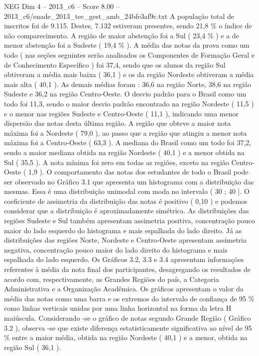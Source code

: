 \begin{textsample}{NEG Dim 4 – 2013\_c6 – Score 8.00 – 2013\_c6/enade\_2013\_tec\_gest\_amb\_24bfe3af9c.txt}
A população total de inscritos foi de 9.115.
Destes, 7.132 estiveram presentes, sendo 21,8 \% o índice de não comparecimento.
A região de maior abstenção foi a Sul ( 23,4 \% ) e a de menor abstenção foi a Sudeste ( 19,4 \% ).
A média das notas da prova como um todo ( nas seções seguintes serão analisados os Componentes de Formação Geral e de Conhecimento Específico ) foi 37,4, sendo que os alunos da região Sul obtiveram a média mais baixa ( 36,1 ) e os da região Nordeste obtiveram a média mais alta ( 40,1 ).
As demais médias foram : 36,6 na região Norte, 38,6 na região Sudeste e 36,2 na região Centro-Oeste.
O desvio padrão para o Brasil como um todo foi 11,3, sendo o maior desvio padrão encontrado na região Nordeste ( 11,5 ) e o menor nas regiões Sudeste e Centro-Oeste ( 11,1 ), indicando uma menor dispersão das notas desta última região.
A região que obteve a maior nota máxima foi a Nordeste ( 79,0 ), ao passo que a região que atingiu a menor nota máxima foi a Centro-Oeste ( 63,3 ).
A mediana do Brasil como um todo foi 37,2, sendo a maior mediana obtida na região Nordeste ( 40,1 ) e a menor obtida na Sul ( 35,5 ).
A nota mínima foi zero em todas as regiões, exceto na região Centro-Oeste ( 1,9 ).
O comportamento das notas dos estudantes de todo o Brasil pode ser observado no Gráfico 3.1 que apresenta um histograma com a distribuição das mesmas.
Essa é uma distribuição unimodal com moda no intervalo ( 30 ; 40 ].
O coeficiente de assimetria da distribuição das notas é positivo ( 0,10 ) e podemos considerar que a distribuição é aproximadamente simétrica.
As distribuições das regiões Sudeste e Sul também apresentam assimetria positiva, concentração pouco maior do lado esquerdo do histograma e mais espalhada do lado direito.
Já as distribuições das regiões Norte, Nordeste e Centro-Oeste apresentam assimetria negativa, concentração pouco maior do lado direito do histograma e mais espalhada do lado esquerdo.
Os Gráficos 3.2, 3.3 e 3.4 apresentam informações referentes à média da nota final dos participantes, desagregando os resultados de acordo com, respectivamente, as Grandes Regiões do país, a Categoria Administrativa e a Organização Acadêmica.
Os gráficos apresentam o valor da média das notas como uma barra e os extremos do intervalo de confiança de 95 \% como linhas verticais unidas por uma linha horizontal na forma da letra H maiúscula.
Considerando -se o gráfico de notas segundo Grande Região ( Gráfico 3.2 ), observa -se que existe diferença estatisticamente significativa ao nível de 95 \% entre a maior média, obtida na região Nordeste ( 40,1 ) e a menor, obtida na região Sul ( 36,1 ).

\end{textsample}
